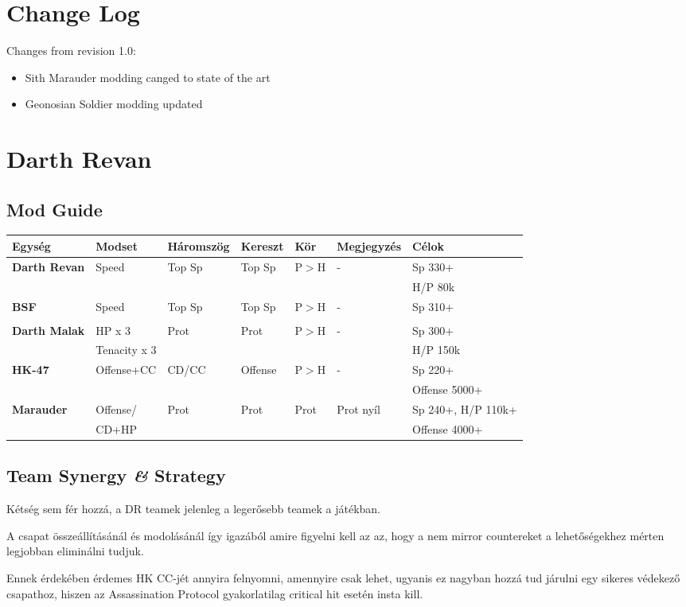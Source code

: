 \documentclass[11pt]{report}
\begin{document}

\chapter{Change Log}
Changes from revision 1.0:
\begin{itemize}
    \item Sith Marauder modding canged to state of the art
    \item Geonosian Soldier modding updated
\end{itemize}


\chapter{Darth Revan}
\section{Mod Guide}
\begin{center}
    \begin{tabular}{|l | l | l | l | l | l | l |}
        \hline
        Egység & Modset & Háromszög & Kereszt & Kör & Megjegyzés & Célok\\ \hline
        \textbf{Darth Revan} & Speed & Top Sp & Top Sp & P$>$H & - & Sp 330+\\ 
        &  &  &  &  &  & H/P 80k\\ \hline
        \textbf{BSF} & Speed & Top Sp & Top Sp & P$>$H & - & Sp 310+\\
        &  &  &  &  &  & \\ \hline
        \textbf{Darth Malak} & HP x 3 & Prot & Prot & P$>$H & - & Sp 300+\\
        & Tenacity x 3 &  &  &  &  & H/P 150k\\ \hline
        \textbf{HK-47} & Offense+CC & CD/CC & Offense & P$>$H & - & Sp 220+\\
        &  &  &  &  &  & Offense 5000+\\ \hline
        \textbf{Marauder} & Offense/ & Prot & Prot & Prot & Prot nyíl & Sp 240+, H/P 110k+\\
        & CD+HP &  &  &  &  & Offense 4000+\\ \hline
    \end{tabular}
\end{center}
\section{Team Synergy \textit{\&} Strategy}
Kétség sem fér hozzá, a DR teamek jelenleg a legerősebb teamek a játékban. \par
A csapat összeállításánál és modolásánál így igazából amire figyelni kell az az, hogy a nem mirror countereket a lehetőségekhez mérten legjobban eliminálni tudjuk.\par
Ennek érdekében érdemes HK CC-jét annyira felnyomni, amennyire csak lehet, ugyanis ez nagyban hozzá tud járulni egy sikeres védekező csapathoz, hiszen az Assassination Protocol gyakorlatilag critical hit esetén insta kill. 
\end{document}
